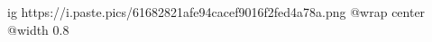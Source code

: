  
 
 
 
 

\ifcmt
  ig https://i.paste.pics/61682821afe94cacef9016f2fed4a78a.png
  @wrap center
  @width 0.8
\fi
